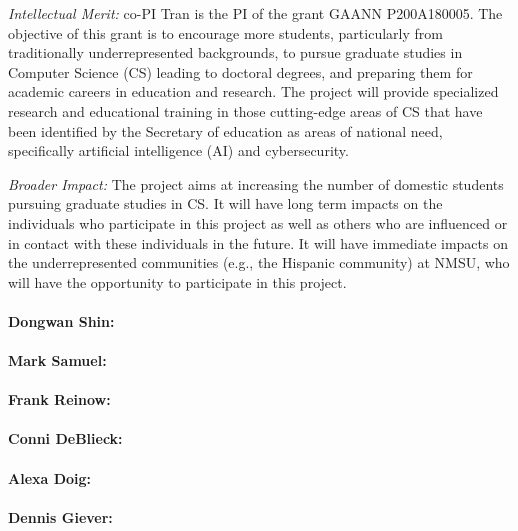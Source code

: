 \noindent \textit{Intellectual Merit:} co-PI Tran is the PI of the grant GAANN P200A180005. The objective of this grant is to encourage more students, particularly from traditionally underrepresented backgrounds, to pursue graduate studies in Computer Science (CS) leading to doctoral degrees, and preparing them for academic careers in education and research. The project will provide specialized research and educational training in those cutting-edge areas of CS that have been identified by the Secretary of education as areas of national need, specifically artificial intelligence (AI) and cybersecurity. 

\noindent \textit{Broader Impact:} The project aims at increasing the number of domestic students pursuing graduate studies in CS. It will have long term impacts on the individuals who participate in this project as well as others who are influenced or in contact with these individuals in the future. It will have immediate impacts on the underrepresented communities (e.g., the Hispanic community) at NMSU, who will have the opportunity to participate in this project.  


\paragraph{Dongwan Shin:}
\paragraph{Mark Samuel:}
\paragraph{Frank Reinow:}
\paragraph{Conni DeBlieck:}
\paragraph{Alexa Doig:}
\paragraph{Dennis Giever:}

